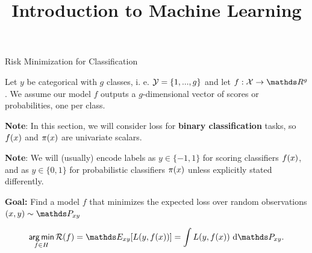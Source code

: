 




\newcommand{\titlefigure}{figure_man/optimization_steps.jpeg}
\newcommand{\learninggoals}{
\item Know the 0-1-loss
\item Derive the point-wise optimum for the 0-1-loss 
\item Understand the concept of the Bayes Optimal Classifier and the Bayes Error 
}

\title{Introduction to Machine Learning}
\date{}






\begin{vbframe}{Risk Minimization for Classification}

Let $y$ be categorical with $g$ classes, i. e.  $\mathcal{Y} = \{1, ..., g\}$ and let $f: \Xspace \to \R^g$. We assume our model $f$ outputs a $g$-dimensional vector of scores or probabilities, one per class.

\lz 

\textbf{Note}: In this section, we will consider loss for \textbf{binary classification} tasks, so $f(x)$ and $\pi(x)$ are univariate scalars.

\lz 

\textbf{Note}: We will (usually) encode labels as $y \in \{-1, 1\}$ for scoring classifiers $f(x)$, and as $y \in \{0, 1\}$ for probabilistic classifiers $\pi(x)$ unless explicitly stated differently. 


\lz

\textbf{Goal:} Find a model $f$ that minimizes the expected loss over random observations $\xy \sim \Pxy$ 

$$
\argmin_{f \in \Hspace} \riskf = \E_{xy}[\Lxy] = \int \Lxy ~ \text{d}\Pxy. 
$$

\end{vbframe}

